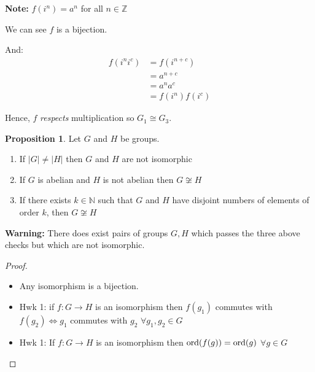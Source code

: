 \documentclass{article}
\theoremstyle{definition} \newtheorem*{definition}{Definition}
\newtheorem{proposition}[theorem]{Proposition}
\newcommand{\ism}{\cong} \newcommand{\elemt}[2]{#1_{{#2}\sigma(#2)}}
\begin{document}
\textbf{Note:} $f(i^n) = a^n$ for all $n \in \mathbb{Z}$

We can see $f$ is a bijection.

And: \begin{align*} f(i^ni^c) &= f(i^{n+c})\\ &= a^{n+c} \\ &= a^n a^c \\ &=
  f(i^n)f(i^c) \end{align*}

Hence, $f$ \emph{respects} multiplication so $G_1 \ism G_3.$\\
\begin{proposition} Let $G$ and $H$ be groups.  \begin{enumerate} \item If $|G|
        \neq |H|$ then $G$ and $H$ are not isomorphic \item If $G$ is abelian
          and $H$ is not abelian then $G \not\ism H$ \item If there exists $k
            \in \mathbb{N}$ such that $G$ and $H$ have disjoint numbers of
            elements of order $k$, then $G \not\ism H$ \end{enumerate}
      \end{proposition}

\textbf{Warning:} There does exist pairs of groups $G, H$ which passes the
three above checks but which are not isomorphic.

\begin{proof}\hfill \begin{itemize} \item Any isomorphism is a bijection.
        \item Hwk 1: if $f : G \rightarrow H$ is an isomorphism then $f(g_1)$
        commutes with $f(g_2) \iff g_1$ commutes with $g_2$ $\forall g_1,g_2
      \in G$ \item Hwk 1: If $f:G\rightarrow H$ is an isomorphism then
        $\operatorname{\text{ord}}(f(g))=\operatorname{\text{ord}}(g)$ $\forall g\in G$ \end{itemize} \end{proof}
\end{document}
